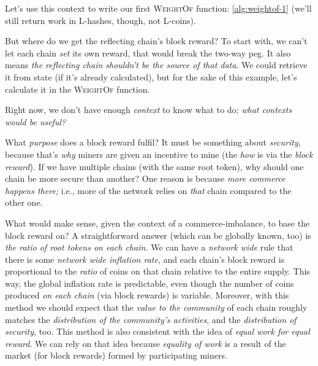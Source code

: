Let's use this context to write our first \textsc{WeightOf} function: \autoref{alg:weightof-1} (we'll still return work in L-hashes, though, not L-coins).




But where do we get the reflecting chain's block reward?
To start with, we can't let each chain \emph{set} its own reward, that would break the two-way peg.
It also means \emph{the reflecting chain shouldn't be the source of that data}.
We could retrieve it from state (if it's already calculated), but for the sake of this example, let's calculate it in the \textsc{WeightOf} function.

Right now, we don't have enough \emph{context} to know what to do; \emph{what contexts would be useful?}

What \emph{purpose} does a block reward fulfil?
It must be something about \emph{security}, because that's \emph{why} miners are given an incentive to mine (the \emph{how} is via the \emph{block reward}).
If we have multiple chains (with the same root token), why should one chain be more secure than another?
One reason is because \emph{more commerce happens there;} i.e., more of the network relies on \emph{that} chain compared to the other one.

What would make sense, given the context of a commerce-imbalance, to base the block reward on?
A straightforward answer (which can be globally known, too) is \emph{the ratio of root tokens on each chain.}
We can have a \emph{network wide} rule that there is some \emph{network wide inflation rate}, and each chain's block reward is proportional to the \emph{ratio} of coins on that chain relative to the entire supply.
This way, the global inflation rate is predictable, even though the number of coins produced \emph{on each chain} (via block rewards) is variable.
Moreover, with this method we should expect that the \emph{value to the community} of each chain roughly matches the \emph{distribution of the community's activities}, and the \emph{distribution of security}, too.
This method is also consistent with the idea of \emph{equal work for equal reward}.
We can rely on that idea because \emph{equality of work} is a result of the market (for block rewards) formed by participating miners.

